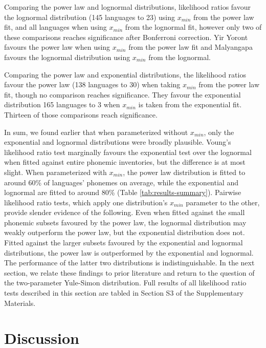 Comparing the power law and lognormal distributions, likelihood ratios favour the lognormal distribution (145 languages to 23) using \(x_{min}\) from the power law fit, and all languages when using \(x_{min}\) from the lognormal fit, however only two of these comparisons reaches significance after Bonferroni correction. Yir Yoront favours the power law when using \(x_{min}\) from the power law fit and Malyangapa favours the lognormal distribution using \(x_{min}\) from the lognormal.

Comparing the power law and exponential distributions, the likelihood ratios favour the power law (138 languages to 30) when taking \(x_{min}\) from the power law fit, though no comparison reaches significance. They favour the exponential distribution 165 languages to 3 when \(x_{min}\) is taken from the exponential fit. Thirteen of those comparisons reach significance.

In sum, we found earlier that when parameterized without \(x_{min}\), only the exponential and lognormal distributions were broadly plausible. Voung's likelihood ratio test marginally favours the exponential test over the lognormal when fitted against entire phonemic inventories, but the difference is at most slight. When parameterized with \(x_{min}\), the power law distribution is fitted to around 60\% of languages' phonemes on average, while the exponential and lognormal are fitted to around 80\% (Table \ref{tab:results-summary}). Pairwise likelihood ratio tests, which apply one distribution's \(x_{min}\) parameter to the other, provide slender evidence of the following. Even when fitted against the small phonemic subsets favoured by the power law, the lognormal distribution may weakly outperform the power law, but the exponential distribution does not. Fitted against the larger subsets favoured by the exponential and lognormal distributions, the power law is outperformed by the exponential and lognormal. The performance of the latter two distributions is indistinguishable. In the next section, we relate these findings to prior literature and return to the question of the two-parameter Yule-Simon distribution. Full results of all likelihood ratio tests described in this section are tabled in Section S3 of the Supplementary Materials.

\hypertarget{discussion}{%
\section{Discussion}\label{discussion}}

